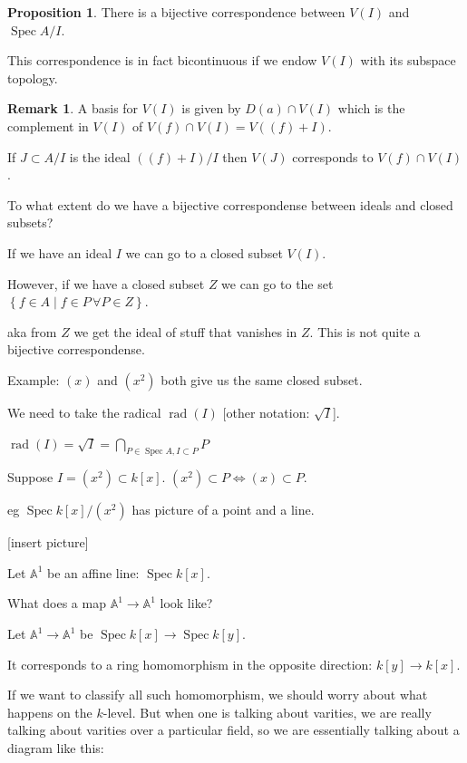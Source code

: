 \documentclass{article}
\theoremstyle{definition}
\newtheorem{proposition}[theorem]{Proposition}
\newtheorem*{remark}{Remark}
\begin{document}
    \begin{proposition}
        There is a bijective correspondence between \(V(I)\) and \(\operatorname{Spec} A / I\).

        This correspondence is in fact bicontinuous if we endow \(V(I)\) with its subspace topology.
    \end{proposition}

    \begin{remark}
        A basis for \(V(I)\) is given by \(D(a) \cap V(I)\) which is the complement in \(V(I)\) of \(V(f) \cap V(I) = V((f) + I)\).

        If \(J \subset A / I\) is the ideal \(((f)+I) / I\) then \(V(J)\) corresponds to \(V(f) \cap V(I)\).
    \end{remark}

    To what extent do we have a bijective correspondense between ideals and closed subsets?

    If we have an ideal \(I\) we can go to a closed subset \(V(I)\).

    However, if we have a closed subset \(Z\) we can go to the set \(\left\{ f \in A \mid f\in P\, \forall P \in Z \right\}\).

    aka from \(Z\) we get the ideal of stuff that vanishes in \(Z\). This is not quite a bijective correspondense.

    Example: \((x)\) and \((x^2)\) both give us the same closed subset.

    We need to take the radical \(\operatorname{rad} (I)\) [other notation: \(\sqrt{I}\)].

    \(\operatorname{rad} (I) = \sqrt{I} = \bigcap_{P \in \operatorname{Spec} A, I \subset P} P\) 

    Suppose \(I = (x^2) \subset k[x]\). \((x^2) \subset P \iff (x) \subset P\).

    eg \(\operatorname{Spec} k[x] / (x^2)\) has picture of a point and a line.

    [insert picture]

    Let \(\mathbb{A}^1\) be an affine line: \(\operatorname{Spec} k[x]\).

    What does a map \(\mathbb{A}^1 \to \mathbb{A}^1\) look like?

    Let \(\mathbb{A}^1 \to \mathbb{A}^1\) be \(\operatorname{Spec} k[x] \to \operatorname{Spec} k[y]\).

    It corresponds to a ring homomorphism in the opposite direction: \(k[y] \to k[x]\).

    If we want to classify all such homomorphism, we should worry about what happens on the \(k\)-level. But when one is talking about varities, we are really talking about varities over a particular field, so we are essentially talking about a diagram like this:
\end{document}
